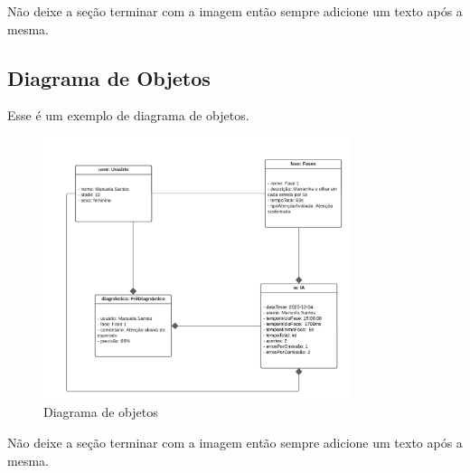 \documentclass[
  a4paper,%
  12pt,%
  english,%
  brazilian,%
]{article}
\begin{document}
     Não deixe a seção terminar com a imagem então sempre adicione um texto após a mesma.

    \subsection*{Diagrama de Objetos}

Esse é um exemplo de diagrama de objetos.

        \begin{figure}[H]
\centering
\caption{Diagrama de objetos}%
\label{fig:diagrama-de-objetos}
\includegraphics[width=0.8\textwidth]{Logos/diagrama-de-objetos.png}
\end{figure}

Não deixe a seção terminar com a imagem então sempre adicione um texto após a mesma.



\end{document}

